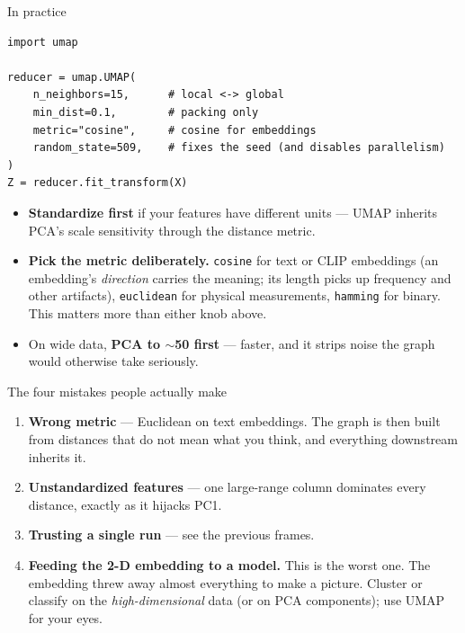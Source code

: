 \documentclass[aspectratio=169]{beamer}
\begin{document}
\begin{frame}[fragile]{In practice}
\begin{lstlisting}
import umap

reducer = umap.UMAP(
    n_neighbors=15,      # local <-> global
    min_dist=0.1,        # packing only
    metric="cosine",     # cosine for embeddings
    random_state=509,    # fixes the seed (and disables parallelism)
)
Z = reducer.fit_transform(X)
\end{lstlisting}
  \vskip 2pt
  \begin{itemize}\small
    \item \textbf{Standardize first} if your features have different units --- UMAP inherits
      PCA's scale sensitivity through the distance metric.
    \item \textbf{Pick the metric deliberately.} \texttt{cosine} for text or CLIP embeddings
      (an embedding's \emph{direction} carries the meaning; its length picks up frequency and
      other artifacts), \texttt{euclidean} for physical measurements, \texttt{hamming} for
      binary. This matters more than either knob above.
    \item On wide data, \textbf{PCA to $\sim$50 first} --- faster, and it strips noise the graph
      would otherwise take seriously.
  \end{itemize}
\end{frame}

\begin{frame}{The four mistakes people actually make}
  \begin{enumerate}
    \item \textbf{Wrong metric} --- Euclidean on text embeddings. The graph is then built from
      distances that do not mean what you think, and everything downstream inherits it.
    \item \textbf{Unstandardized features} --- one large-range column dominates every distance,
      exactly as it hijacks PC1.
    \item \textbf{Trusting a single run} --- see the previous frames.
    \item \textbf{Feeding the 2-D embedding to a model.} This is the worst one. The embedding
      threw away almost everything to make a picture. Cluster or classify on the
      \emph{high-dimensional} data (or on PCA components); use UMAP for your eyes.
  \end{enumerate}
\end{frame}
\end{document}
